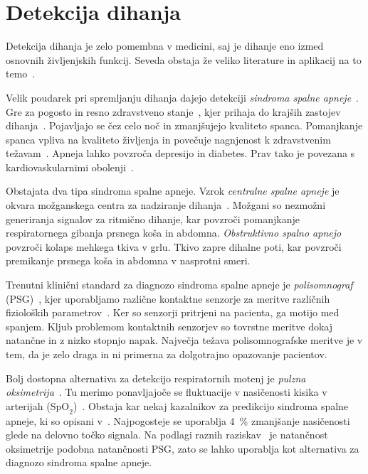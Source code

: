 \section{Detekcija dihanja}\label{sec:detekcija-dihanja}
Detekcija dihanja je zelo pomembna v medicini, saj je dihanje eno izmed osnovnih življenjskih funkcij. Seveda obstaja že veliko literature in aplikacij na to temo~\cite{sathyanarayana2015vision}.

Velik poudarek pri spremljanju dihanja dajejo detekciji  \emph{sindroma spalne apneje}~\cite{sathyanarayana2015vision}. Gre za pogosto in resno zdravstveno stanje~\cite{wang2006vision}, kjer prihaja do krajših zastojev dihanja~\cite{flemons2002obstructive}. Pojavljajo se čez celo noč in zmanjšujejo kvaliteto spanca. Pomanjkanje spanca vpliva na kvaliteto življenja in povečuje nagnjenost k zdravstvenim težavam~\cite{malhotra2002obstructive}. Apneja lahko povzroča depresijo in diabetes. Prav tako je povezana s kardiovaskularnimi obolenji~\cite{takemura2005respiratory}.

Obstajata dva tipa sindroma spalne apneje. Vzrok \emph{centralne spalne apneje} je okvara možganskega centra za nadziranje dihanja~\cite{javaheri2010central}. Možgani so nezmožni generiranja signalov za ritmično dihanje, kar povzroči pomanjkanje respiratornega gibanja prsnega koša in abdomna. \emph{Obstruktivno spalno apnejo} povzroči kolaps mehkega tkiva v grlu. Tkivo zapre dihalne poti, kar povzroči premikanje prsnega koša in abdomna v nasprotni smeri.

Trenutni klinični standard za diagnozo sindroma spalne apneje je \emph{polisomnograf} (PSG)~\cite{collop2007clinical}, kjer uporabljamo različne kontaktne senzorje za meritve različnih fizioloških parametrov~\cite{heinrich2015video}. Ker so senzorji pritrjeni na pacienta, ga motijo med spanjem. Kljub problemom kontaktnih senzorjev so tovrstne meritve dokaj natančne in z nizko stopnjo napak. Največja težava polisomnografske meritve je v tem, da je zelo draga in ni primerna za dolgotrajno opazovanje pacientov.

Bolj dostopna alternativa za detekcijo respiratornih motenj je \emph{pulzna oksimetrija}~\cite{netzer2001overnight}. Tu merimo ponavljajoče se fluktuacije v nasičenosti kisika v arterijah ($\mathrm{SpO}_{2}$)~\cite{levy1996accuracy}. Obstaja kar nekaj kazalnikov za predikcijo sindroma spalne apneje, ki so opisani v~\cite{netzer2001overnight, magalang2003prediction}. Najpogosteje se uporablja \SI{4}{\%} zmanjšanje nasičenosti glede na delovno točko signala. Na podlagi raznih raziskav~\cite{cooper1991value,magalang2003prediction,netzer2001overnight,levy1996accuracy} je natančnost oksimetrije podobna natančnosti PSG, zato se lahko uporablja kot alternativa za diagnozo sindroma spalne apneje.

